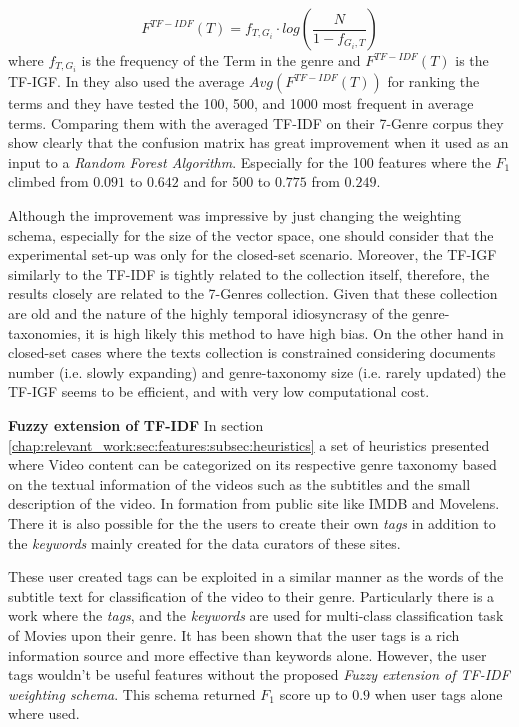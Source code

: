  \begin{equation}\label{chap:relevant_work:eq:tf_igf}
 	F^{TF-IDF}(T) = f_{T,G_{i}} \cdot log \left( \frac{N}{1 - f_{G_{i},T}} \right)
 \end{equation}
\noindent
where $f_{T,G_{i}}$ is the frequency of the Term in the genre and $F^{TF-IDF}(T)$  is the TF-IGF. In  \parencite{sugiyanto2014term} they also used the average $Avg(F^{TF-IDF}(T))$ for ranking the terms and they have tested the 100, 500, and 1000 most frequent in average terms. Comparing them with the averaged TF-IDF on their 7-Genre corpus they show clearly that the confusion matrix has great improvement when it used as an input to a \textit{Random Forest Algorithm}. Especially for the 100 features where the $F_{1}$ climbed from $0.091$ to $0.642$ and for 500 to $0.775$ from $0.249$.

Although the improvement was impressive by just changing the weighting schema, especially for  the size of the vector space, one should consider that the experimental set-up was only for the closed-set scenario. Moreover, the TF-IGF similarly to the TF-IDF is tightly related to the collection itself, therefore, the results closely are related to the 7-Genres collection. Given that these collection are old and the nature of the highly temporal idiosyncrasy of the genre-taxonomies, it is high likely this method to have high bias. On the other hand in closed-set cases where the texts collection is constrained considering documents number (i.e. slowly expanding) and genre-taxonomy size (i.e. rarely updated) the TF-IGF seems to be efficient, and with very low computational cost.  

\textbf{Fuzzy extension of TF-IDF} In section \ref{chap:relevant_work:sec:features:subsec:heuristics} a set of heuristics presented where Video content can be categorized on its respective genre taxonomy based on the textual information of the videos such as the subtitles and the small description of the video. In formation from public site like IMDB and Movelens. There it is also possible for the the users to create their own \textit{tags} in addition to the \textit{keywords} mainly created for the data curators of these sites. 

These user created tags can be exploited in a similar manner as the words of the subtitle text for classification of the video to their genre. Particularly there is a work where the \textit{tags}, and the \textit{keywords} are used for multi-class classification task of Movies upon their genre. It has been shown that the user tags is a rich information source and more effective than keywords alone. However, the user tags wouldn't be useful features without the proposed \textit{Fuzzy extension of TF-IDF weighting schema}.  This schema returned $F_{1}$ score up to $0.9$ when user tags alone where used.

